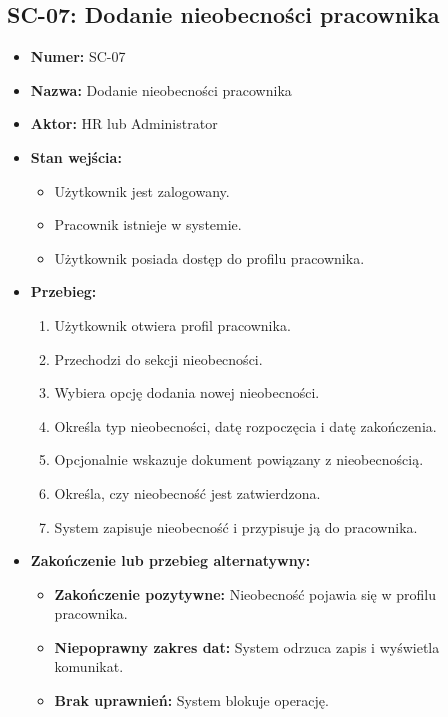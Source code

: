 \subsection{SC-07: Dodanie nieobecności pracownika}
\begin{itemize}
    \item \textbf{Numer:} SC-07
    \item \textbf{Nazwa:} Dodanie nieobecności pracownika
    \item \textbf{Aktor:} HR lub Administrator
    \item \textbf{Stan wejścia:}
    \begin{itemize}
        \item Użytkownik jest zalogowany.
        \item Pracownik istnieje w systemie.
        \item Użytkownik posiada dostęp do profilu pracownika.
    \end{itemize}
    \item \textbf{Przebieg:}
    \begin{enumerate}
        \item Użytkownik otwiera profil pracownika.
        \item Przechodzi do sekcji nieobecności.
        \item Wybiera opcję dodania nowej nieobecności.
        \item Określa typ nieobecności, datę rozpoczęcia i datę zakończenia.
        \item Opcjonalnie wskazuje dokument powiązany z nieobecnością.
        \item Określa, czy nieobecność jest zatwierdzona.
        \item System zapisuje nieobecność i przypisuje ją do pracownika.
    \end{enumerate}
    \item \textbf{Zakończenie lub przebieg alternatywny:}
    \begin{itemize}
        \item \textbf{Zakończenie pozytywne:} Nieobecność pojawia się w profilu pracownika.
        \item \textbf{Niepoprawny zakres dat:} System odrzuca zapis i wyświetla komunikat.
        \item \textbf{Brak uprawnień:} System blokuje operację.
    \end{itemize}
\end{itemize}

